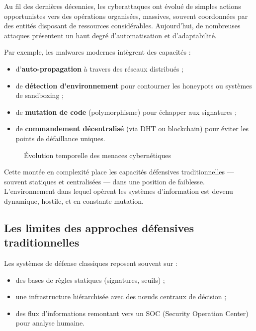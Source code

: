 \documentclass[ twoside,openright,titlepage,numbers=noenddot,headinclude,%
                footinclude=true,cleardoublepage=empty,abstractoff, %
                BCOR=5mm,paper=a4,fontsize=11pt,%
                french,american,%
                ]{scrreprt}
\begin{document}
Au fil des dernières décennies, les cyberattaques ont évolué de simples actions opportunistes vers des opérations organisées, massives, souvent coordonnées par des entités disposant de ressources considérables. Aujourd'hui, de nombreuses attaques présentent un haut degré d'automatisation et d'adaptabilité.

Par exemple, les malwares modernes intègrent des capacités :
\begin{itemize}
    \item d'\textbf{auto-propagation} à travers des réseaux distribués ;
    \item de \textbf{détection d'environnement} pour contourner les honeypots ou systèmes de sandboxing ;
    \item de \textbf{mutation de code} (polymorphisme) pour échapper aux signatures ;
    \item de \textbf{commandement décentralisé} (via DHT ou blockchain) pour éviter les points de défaillance uniques.
\end{itemize}

\begin{figure}[H]
    \centering
    \caption{Évolution temporelle des menaces cybernétiques}
    \label{fig:evolution-menaces}
\end{figure}

Cette montée en complexité place les capacités défensives traditionnelles — souvent statiques et centralisées — dans une position de faiblesse. L'environnement dans lequel opèrent les systèmes d'information est devenu dynamique, hostile, et en constante mutation.

\vspace{0.5em}
\subsection*{Les limites des approches défensives traditionnelles}

Les systèmes de défense classiques reposent souvent sur :
\begin{itemize}
    \item des bases de règles statiques (signatures, seuils) ;
    \item une infrastructure hiérarchisée avec des nœuds centraux de décision ;
    \item des flux d'informations remontant vers un SOC (Security Operation Center) pour analyse humaine.
\end{itemize}
\end{document}
